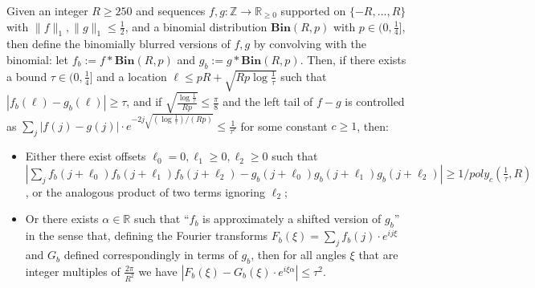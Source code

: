 \documentclass[11pt]{article}
\theoremstyle{plain}
\newcommand{\Bin}[2]{\textbf{Bin}(#1,#2)}
\begin{document}
\begin{lemma}\label{lem:combined-contrapositive}
Given an integer $R\geq 250$ and sequences $f,g:\mathbb{Z}\rightarrow\mathbb{R}_{\geq 0}$ supported on $\{-R,\ldots,R\}$ with $\|f\|_1,\|g\|_1\leq \frac{1}{2}$, and a binomial distribution $\Bin{R}{p}$ with $p\in (0,\frac{1}{4}]$, then define the binomially blurred versions of $f,g$ by convolving with the binomial: let $f_b:=f\ast \Bin{R}{p}$ and $g_b:=g\ast \Bin{R}{p}$. Then, if there exists a bound $\tau\in (0,\frac{1}{4}]$ and a location $\ell\leq pR+\sqrt{Rp\log\frac{1}{\tau}}$  such that $|f_b(\ell)-g_b(\ell)|\geq\tau$, and if $\sqrt{\frac{\log\frac{1}{\tau}}{Rp}}\leq \frac{\pi}{8}$ and the left tail of $f-g$ is controlled as $\sum_j |f(j)-g(j)|\cdot e^{-2j\sqrt{(\log\frac{1}{\tau})/(Rp)}}\leq \frac{1}{\tau^c}$ for some constant $c\geq 1$, then: 
\begin{itemize}
    \item[\textup{1)}] Either there exist offsets $\ell_0=0,\ell_1\geq 0,\ell_2\geq 0$ such that $|\sum_j f_b(j+\ell_0)f_b(j+\ell_1)f_b(j+\ell_2)-g_b(j+\ell_0)g_b(j+\ell_1)g_b(j+\ell_2)|\geq 1/poly_c(\frac{1}{\tau},R)$, or the analogous product of two terms ignoring $\ell_2$;
    \item[\textup{2)}] Or there exists $\alpha\in\mathbb{R}$ such that ``$f_b$ is approximately a shifted version of $g_b$'' in the sense that, defining the Fourier transforms $F_b(\xi)=\sum_j f_b(j)\cdot  e^{ij\xi}$ and $G_b$ defined correspondingly in terms of $g_b$, then for all angles $\xi$ that are integer multiples of $\frac{2\pi}{R^2}$ we have $|F_b(\xi)-G_b(\xi)\cdot e^{i\xi \alpha}|\leq \tau^2$.
\end{itemize}

\end{lemma}
\end{document}

